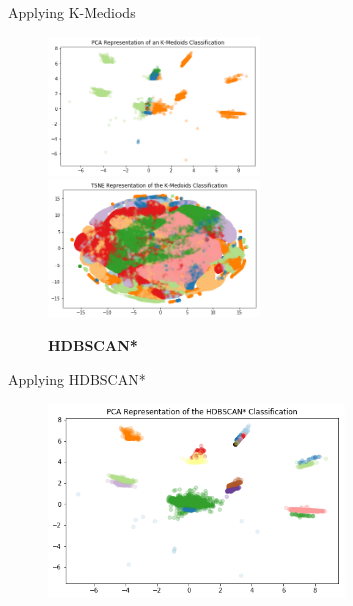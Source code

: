 \documentclass[10pt,xcolor={table,dvipsnames},t]{beamer}
\begin{document}
\begin{frame}{Applying K-Mediods}
\begin{figure}
\begin{center}
    \includegraphics[width=0.5\textwidth]{images/kmed_pca.png}
    \includegraphics[width=0.5\textwidth]{images/kmed_tsne.png}
\end{center}
\end{figure}
\end{frame}

\begin{frame}
\begin{figure}
\vspace*{9em}
\Huge \textbf{HDBSCAN*}
\hline
\vspace*{\fill}
\end{figure}
\end{frame}

\begin{frame}{Applying HDBSCAN*}
\begin{figure}
\begin{center}
    \includegraphics[width=0.7\textwidth]{images/hdbscan_pca.png}
\end{center}
\end{figure}
\end{frame}
\end{document}
